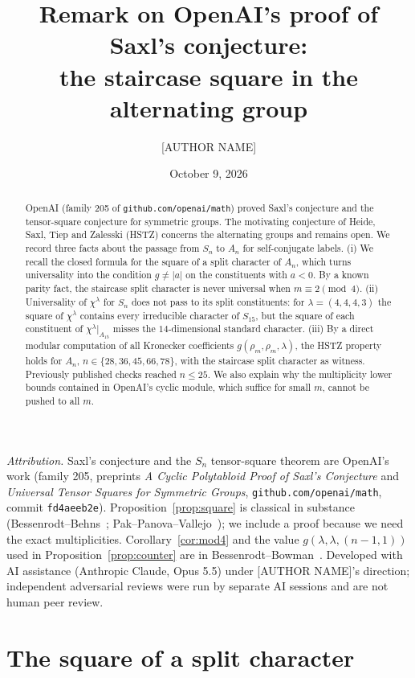 \documentclass[11pt]{amsart}
\title[Staircase squares in alternating groups]{Remark on OpenAI's proof of Saxl's conjecture:\\
the staircase square in the alternating group}
\author{[AUTHOR NAME]}
\date{October 9, 2026}
\theoremstyle{remark}
\begin{document}
\begin{abstract}
OpenAI (family 205 of \texttt{github.com/openai/math}) proved Saxl's conjecture and the
tensor-square conjecture for symmetric groups. The motivating conjecture of Heide, Saxl,
Tiep and Zalesski (HSTZ) concerns the alternating groups and remains open. We record three
facts about the passage from $S_n$ to $A_n$ for self-conjugate labels. (i) We recall the
closed formula for the square of a split character of $A_n$, which turns universality into
the condition $g\ne|a|$ on the constituents with $a<0$. By a known parity fact, the staircase
split character is never universal when $m\equiv2\pmod 4$. (ii) Universality of $\chi^\lambda$ for $S_n$ does
not pass to its split constituents: for $\lambda=(4,4,4,3)$ the square of $\chi^\lambda$
contains every irreducible character of $S_{15}$, but the square of each constituent of
$\chi^\lambda|_{A_{15}}$ misses the $14$-dimensional standard character. (iii) By a direct
modular computation of all Kronecker coefficients $g(\rho_m,\rho_m,\lambda)$, the HSTZ
property holds for $A_n$, $n\in\{28,36,45,66,78\}$, with the staircase split character as
witness. Previously published checks reached $n\le 25$. We also explain why the multiplicity
lower bounds contained in OpenAI's cyclic module, which suffice for small $m$, cannot be
pushed to all $m$.
\end{abstract}
\maketitle

\noindent\emph{Attribution.} Saxl's conjecture and the $S_n$ tensor-square theorem are
OpenAI's work (family 205, preprints \emph{A Cyclic Polytabloid Proof of Saxl's Conjecture}
and \emph{Universal Tensor Squares for Symmetric Groups}, \texttt{github.com/openai/math},
commit \texttt{fd4aeeb2e}). Proposition~\ref{prop:square} is classical in substance
(Bessenrodt--Behns~\cite{BB}; Pak--Panova--Vallejo~\cite[Main Lemma]{PPV}); we include a
proof because we need the exact multiplicities. Corollary~\ref{cor:mod4} and the value
$g(\lambda,\lambda,(n-1,1))$ used in Proposition~\ref{prop:counter} are in
Bessenrodt--Bowman~\cite[Thm.~6.1, Cor.~6.2]{BBow}. Developed with AI assistance (Anthropic
Claude, Opus 5.5) under [AUTHOR NAME]'s direction; independent adversarial reviews were run
by separate AI sessions and are not human peer review.

\section{The square of a split character}
\end{document}
